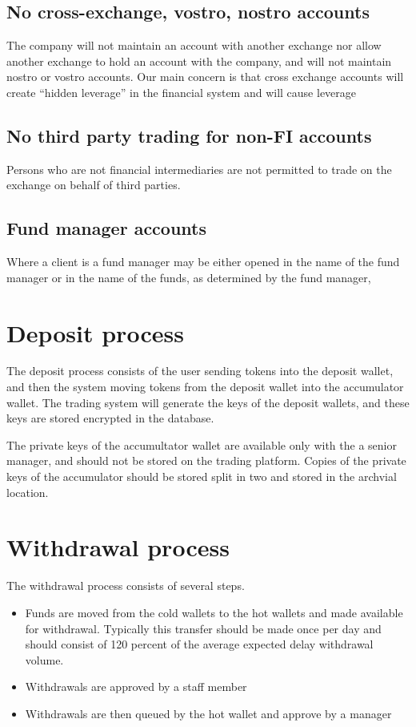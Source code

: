 \subsection{No cross-exchange, vostro, nostro accounts}
The company will not maintain an account with another exchange nor
allow another exchange to hold an account with the company, and will
not maintain nostro or vostro accounts.  Our main concern is that
cross exchange accounts will create ``hidden leverage'' in the
financial system and will cause leverage

\subsection{No third party trading for non-FI accounts}
Persons who are not financial intermediaries are not permitted to
trade on the exchange on behalf of third parties.

\subsection{Fund manager accounts}
Where a client is a fund manager may be either opened in the name of
the fund manager or in the name of the funds, as determined by the
fund manager,

\section{Deposit process}
The deposit process consists of the user sending tokens into the
deposit wallet, and then the system moving tokens from the deposit
wallet into the accumulator wallet.  The trading system will generate
the keys of the deposit wallets, and these keys are stored encrypted
in the database.

The private keys of the accumultator wallet are available only with
the a senior manager, and should not be stored on the trading
platform.  Copies of the private keys of the accumulator should be
stored split in two and stored in the archvial location.

\section{Withdrawal process}

The withdrawal process consists of several steps.
\begin{itemize}
  \item Funds are moved from the cold wallets to the hot wallets and
    made available for withdrawal.  Typically this transfer should be
    made once per day and should consist of 120 percent of the average
    expected delay withdrawal volume.
  \item Withdrawals are approved by a staff member
  \item Withdrawals are then queued by the hot wallet and approve by a manager
\end{itemize}

